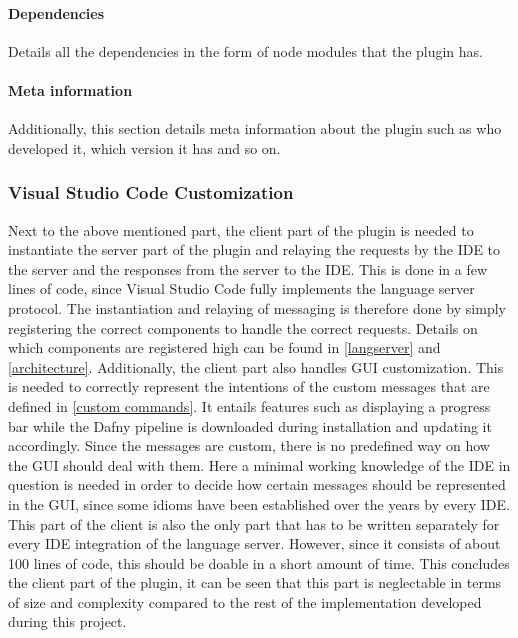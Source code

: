 \paragraph{Dependencies}
Details all the dependencies in the form of node modules that the plugin has.

\paragraph{Meta information}
Additionally, this section details meta information about the plugin such as who developed it, which version it has and so on.

\subsubsection{Visual Studio Code Customization}
Next to the above mentioned part, the client part of the plugin is needed to instantiate the server part of the plugin and relaying the requests by the IDE to the server and the responses from the server to the IDE. This is done in a few lines of code, since Visual Studio Code fully implements the language server protocol. The instantiation and relaying of messaging is therefore done by simply registering the correct components to handle the correct requests. Details on which components are registered high can be found in \ref{langserver} and \ref{architecture}.\newline
Additionally, the client part also handles GUI customization. This is needed to correctly represent the intentions of the custom messages that are defined in \ref{custom commands}. It entails features such as displaying a progress bar while the Dafny pipeline is downloaded during installation and updating it accordingly. Since the messages are custom, there is no predefined way on how the GUI should deal with them. Here a minimal working knowledge of the IDE in question is needed in order to decide how certain messages should be represented in the GUI, since some idioms have been established over the years by every IDE. \newline
This part of the client is also the only part that has to be written separately for every IDE integration of the language server. However, since it consists of about 100 lines of code, this should be doable in a short amount of time. This concludes the client part of the plugin, it can be seen that this part is neglectable in terms of size and complexity compared to the rest of the implementation developed during this project. 

